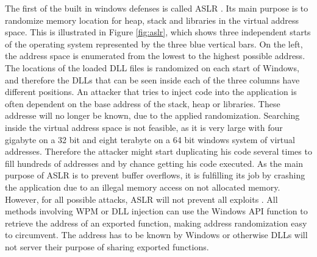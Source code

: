 The first of the built in windows defenses is called \gls{ASLR} \cite{miller2009method}. Its main purpose is to randomize memory location for heap, stack and libraries in the virtual address space. This is illustrated in Figure \ref{fig:aslr}, which shows three independent starts of the operating system represented by the three blue vertical bars. On the left, the address space is enumerated from the lowest to the highest possible address. The locations of the loaded \gls{DLL} files is randomized on each start of Windows, and therefore the \glspl{DLL} that can be seen inside each of the three columns have different positions. An attacker that tries to inject code into the application is often dependent on the base address of the stack, heap or libraries. These addresse will no longer be known, due to the applied randomization. Searching inside the virtual address space is not feasible, as it is very large with four gigabyte on a 32 bit and eight terabyte on a 64 bit windows system of virtual addresses. Therefore the attacker might start duplicating his code several times to fill hundreds of addresses and by chance getting his code executed. As the main purpose of \gls{ASLR} is to prevent buffer overflows, it is fulfilling its job by crashing the application due to an illegal memory access on not allocated memory. However, for all possible attacks, \gls{ASLR} will not prevent all exploits \cite{shacham}. All methods involving \gls{WPM} or \gls{DLL} injection can use the Windows \gls{API} function  to retrieve the address of an exported function, making address randomization easy to circumvent. The address has to be known by Windows or otherwise \glspl{DLL} will not server their purpose of sharing exported functions.